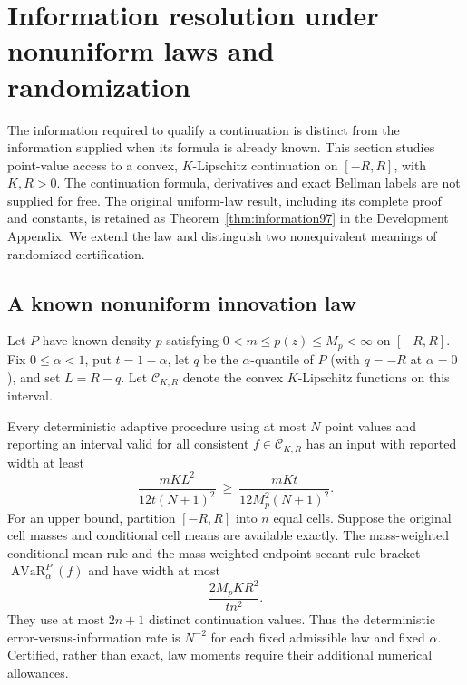 \section{Information resolution under nonuniform laws and randomization}\label{sec:information99}
The information required to qualify a continuation is distinct from the information supplied when its formula is already known. This section studies point-value access to a convex, $K$-Lipschitz continuation on $[-R,R]$, with $K,R>0$. The continuation formula, derivatives and exact Bellman labels are not supplied for free. The original uniform-law result, including its complete proof and constants, is retained as Theorem~\ref{thm:information97} in the Development Appendix. We extend the law and distinguish two nonequivalent meanings of randomized certification.

\subsection{A known nonuniform innovation law}
Let $P$ have known density $p$ satisfying $0<m\le p(z)\le M_p<\infty$ on $[-R,R]$. Fix $0\le\alpha<1$, put $t=1-\alpha$, let $q$ be the $\alpha$-quantile of $P$ (with $q=-R$ at $\alpha=0$), and set $L=R-q$. Let $\mathcal C_{K,R}$ denote the convex $K$-Lipschitz functions on this interval.

\begin{theorem}\label{thm:nonuniform99}
Every deterministic adaptive procedure using at most $N$ point values and reporting an interval valid for all consistent $f\in\mathcal C_{K,R}$ has an input with reported width at least
\begin{equation}\label{eq:lower99}
 \frac{mKL^2}{12t(N+1)^2}
 \ \ge\ \frac{mKt}{12M_p^2(N+1)^2}.
\end{equation}
For an upper bound, partition $[-R,R]$ into $n$ equal cells. Suppose the original cell masses and conditional cell means are available exactly. The mass-weighted conditional-mean rule and the mass-weighted endpoint secant rule bracket $\operatorname{AVaR}_\alpha^P(f)$ and have width at most
\begin{equation}\label{eq:upper99}
 \frac{2M_pKR^2}{t n^2}.
\end{equation}
They use at most $2n+1$ distinct continuation values. Thus the deterministic error-versus-information rate is $N^{-2}$ for each fixed admissible law and fixed $\alpha$. Certified, rather than exact, law moments require their additional numerical allowances.
\end{theorem}

